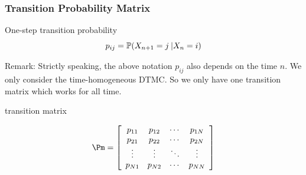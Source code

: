 \documentclass[english,10pt]{beamer}
\begin{document}
\begin{frame}
\frametitle{Transition Probability Matrix}
\begin{block}
{One-step transition probability}
\textrm{
\[
p_{ij}=\mathbb{P}(X_{n+1}=j\:\vert X_{n}=i)
\]
}
\end{block}

Remark:  Strictly speaking, the above notation $p_{ij}$ also depends on
the time $n$.  We only consider the time-homogeneous DTMC.
So we only have one transition matrix which works for all time.

\begin{block}
{  transition   matrix}

\[
\Pm=\left[\begin{array}{cccc}
p_{11} & p_{12} & \cdots & p_{1N}\\
p_{21} & p_{22} & \cdots & p_{2N}\\
\vdots & \vdots & \ddots & \vdots\\
p_{N1} & p_{N2} & \cdots & p_{NN}
\end{array}\right]
\]

\end{block}

\end{frame}


\end{document}
